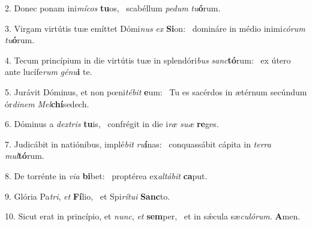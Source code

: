 2. Donec ponam ini\textit{mí}\textit{cos} \textbf{tu}os, \ast\  scabéllum \textit{pe}\textit{dum} \textit{tu}\textbf{ó}rum.\

3. Virgam virtútis tuæ emíttet Dómi\textit{nus} \textit{ex} \textbf{Si}on: \ast\  domináre in médio inimi\textit{có}\textit{rum} \textit{tu}\textbf{ó}rum.\

4. Tecum princípium in die virtútis tuæ in splendóri\textit{bus} \textit{sanc}\textbf{tó}rum: \ast\  ex útero ante lucífe\textit{rum} \textit{gé}\textit{nu}\textbf{i} te.\

5. Jurávit Dóminus, et non pœni\textit{té}\textit{bit} \textbf{e}um: \ast\  Tu es sacérdos in ætérnum secúndum ór\textit{di}\textit{nem} \textit{Mel}\textbf{chí}sedech.\

6. Dóminus a \textit{dex}\textit{tris} \textbf{tu}is, \ast\  confrégit in die i\textit{ræ} \textit{su}\textit{æ} \textbf{re}ges.\

7. Judicábit in natiónibus, implé\textit{bit} \textit{ru}\textbf{í}nas: \ast\  conquassábit cápita in \textit{ter}\textit{ra} \textit{mul}\textbf{tó}rum.\

8. De torrénte in \textit{vi}\textit{a} \textbf{bi}bet: \ast\  proptérea ex\textit{al}\textit{tá}\textit{bit} \textbf{ca}put.\

9. Glória Pa\textit{tri}, \textit{et} \textbf{Fí}lio, \ast\  et Spi\textit{rí}\textit{tu}\textit{i} \textbf{Sanc}to.\

10. Sicut erat in princípio, et \textit{nunc}, \textit{et} \textbf{sem}per, \ast\  et in sǽcula sæ\textit{cu}\textit{ló}\textit{rum}. \textbf{A}men.\

